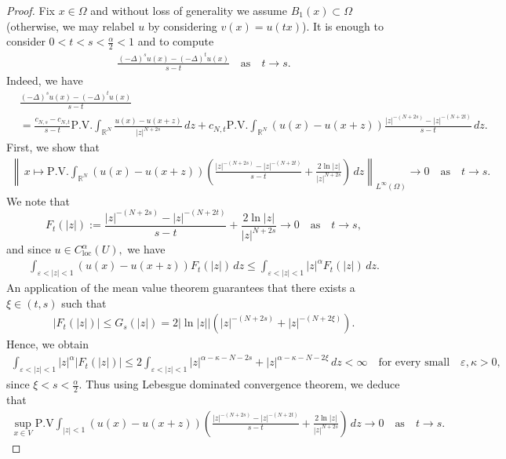 \documentclass[notitlepage,11pt,reqno]{amsart}
\theoremstyle{definition}
\numberwithin{equation}{section}
\newcommand{\loc}{\mathrm{loc}}
\newcommand{\RR}{\mathds{R}}
\begin{document}
\begin{proof} %
Fix $x\in \Omega$ and without loss of generality we assume $B_1(x)\subset \Omega$ (otherwise, we may relabel $u$ by considering $v(x)=u(tx)$). It is enough to consider $0<t<s<\frac{\alpha}{2}<1$ and to compute
\begin{align*}
\frac{(-\Delta)^s u(x)-(-\Delta)^t u(x)}{s-t}\quad \text{as}\quad t\to s.
\end{align*}
Indeed, we have
\begin{align*}
&\frac{(-\Delta)^s u(x)-(-\Delta)^t u(x)}{s-t}\\
&=\frac{c_{N, s}-c_{N, t}}{s-t}\text{P.V.}\int_{\RR^N}\frac{u(x)-u(x+z)}{|z|^{N+2s}}\,dz+c_{N, t}\text{P.V.}\int_{\RR^N}\left(u(x)-u(x+z)\right)\frac{|z|^{-(N+2s)}-|z|^{-(N+2t)}}{s-t}\, dz.
\end{align*}
First, we show that
\begin{align}\label{eq:convergence}
\left\|\,x\mapsto\text{P.V.}\int_{\RR^N}\left(u(x)-u(x+z)\right)\left(\frac{|z|^{-(N+2s)}-|z|^{-(N+2t)}}{s-t}+\frac{2\ln|z|}{|z|^{N+2s}}\right)\, dz\right\|_{L^{\infty}(\Omega)} \to 0\quad \text{as} \quad t\to s.
\end{align}
We note that \[F_t(|z|):=\frac{|z|^{-(N+2s)}-|z|^{-(N+2t)}}{s-t}+\frac{2\ln|z|}{|z|^{N+2s}}\to 0 \quad \text{as}\quad t\to s,\]
and since $u \in C^{\alpha}_{\loc}(U),$ we have
\begin{align*}
    \int_{\varepsilon < |z|< 1}\left(u(x)-u(x+z)\right)F_t(|z|)\, dz \leq \int_{\varepsilon < |z|< 1}|z|^{\alpha}F_t(|z|)\, dz.
\end{align*}
An application of the mean value theorem guarantees that there exists a $\xi\in (t, s)$ such that
\begin{align*}
|F_t(|z|)|\leq G_s(|z|)=2|\ln |z||\left(|z|^{-(N+2s)}+|z|^{-(N+2\xi)}\right).
\end{align*}
Hence, we obtain
\begin{align*}
\int_{\varepsilon<|z|<1}|z|^{\alpha}|F_t(|z|)|\leq 2\int_{\varepsilon<|z|<1}|z|^{\alpha-\kappa-N-2s}+|z|^{\alpha-\kappa-N-2\xi}\, dz<\infty\quad \text{for every small}\quad \varepsilon, \kappa>0,
\end{align*}
since $\xi<s<\frac{\alpha}{2}.$ Thus using Lebesgue dominated convergence theorem, we deduce that 
\begin{align*}
\sup_{x\in V }\text{P.V} \int_{|z|<1}\left(u(x)-u(x+z)\right)\left(\frac{|z|^{-(N+2s)}-|z|^{-(N+2t)}}{s-t}+\frac{2\ln|z|}{|z|^{N+2s}}\right)\, dz \to 0\quad \text{as} \quad t\to s.

\end{align*}
\end{proof}
\end{document}

